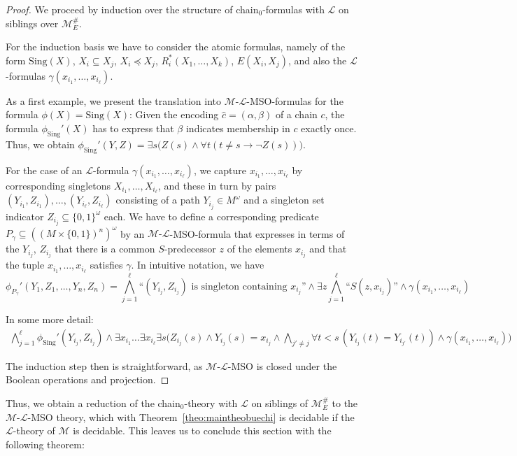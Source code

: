 \documentclass[copyright,creativecommons]{eptcs}
\theoremstyle{plain}
\theoremstyle{nonumberplain}
\newtheorem{proof}{Proof}
\newcommand{\eat}[1]{}
\newcommand{\m}{\ensuremath{\mathcal{M}}}
\newcommand{\el}{\ensuremath{\mathcal{L}}}
\newcommand{\ml}{\ensuremath{\m\textrm{-}\el}}
\newcommand{\Sing}{\ensuremath{\textrm{Sing}}}
\newcommand{\MweakE}{\ensuremath{\m^{\#}_E}}
\begin{document}
\begin{proof}
We proceed by induction over the structure of chain$_0$-formulas with $\el$ on siblings over $\MweakE$.

For the induction basis we have to consider the atomic formulas, namely of the form 
$\Sing(X)$, $X_i \subseteq X_j$, $X_i \preceq X_j$, $R_i^*(X_1,\dots,X_k)$, $E(X_i,X_j)$, and also the $\el$-formulas $\gamma(x_{i_1},\dots,x_{i_\ell})$.

As a first example, we present the translation into $\ml$-MSO-formulas for the formula $\phi(X)=\Sing(X)$: Given the encoding $\hat{c}=(\alpha,\beta)$ of a chain $c$, the formula $\phi_{\Sing}'(X)$ has to express that $\beta$ indicates membership in $c$ exactly once. Thus, we obtain $\phi_{\Sing}'(Y,Z)=\exists s\big(Z(s) \wedge \forall t(t \neq s \to \neg Z(s))\big)$. 

For the case of an $\el$-formula $\gamma(x_{i_1},\dots,x_{i_\ell})$, we capture $x_{i_1},\ldots,x_{i_\ell}$ by corresponding singletons $X_{i_1},\ldots,X_{i_\ell}$, and these in turn by pairs $(Y_{i_1},Z_{i_1}),\ldots,(Y_{i_\ell},Z_{i_\ell})$ consisting of a path $Y_{i_j} \in M^\omega$ and a singleton set indicator $Z_{i_j} \subseteq \{0,1\}^\omega$ each. We have to define a corresponding predicate $P_\gamma \subseteq ((M \times \{0,1\})^n)^\omega$ by an $\ml$-MSO-formula\eat{$\phi_{P_\gamma}'$} that expresses in terms of the $Y_{i_j}$, $Z_{i_j}$ that there is a common $S$-predecessor $z$ of the elements $x_{i_j}$ and that the tuple $x_{i_1},\ldots,x_{i_\ell}$ satisfies $\gamma$. In intuitive notation, we have
$$
\phi_{P_\gamma}'(Y_1,Z_1,\ldots,Y_n,Z_n)= \bigwedge_{j=1}^\ell \text{``$(Y_{i_j},Z_{i_j})$ is singleton containing $x_{i_j}$''} \wedge \exists z \bigwedge_{j=1}^\ell \text{``}S(z,x_{i_j})\text{''} \wedge \gamma(x_{i_1},\ldots,x_{i_\ell})
$$

In some more detail:
\begin{multline*}
\bigwedge_{j=1}^\ell \phi_{\Sing}'(Y_{i_j},Z_{i_j}) \wedge \exists x_{i_1}\ldots\exists x_{i_\ell}\exists s \big(Z_{i_j}(s) \wedge Y_{i_j}(s)=x_{i_j} \wedge \bigwedge_{j' \neq j} \forall t < s\, (Y_{i_j}(t)=Y_{i_{j'}}(t)) \wedge \gamma(x_{i_1},\ldots,x_{i_\ell}) \big)
\end{multline*}

The induction step then is straightforward, as $\ml$-MSO is closed under the Boolean operations and projection. \end{proof}
Thus, we obtain a reduction of the chain$_0$-theory  with $\el$ on siblings of $\MweakE$ to the $\ml$-MSO theory, which with Theorem~\ref{theo:maintheobuechi} is decidable if the $\el$-theory of $\m$ is decidable. This leaves us to conclude this section with the following theorem:
\end{document}
